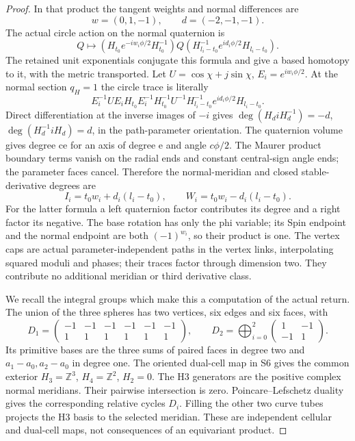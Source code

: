 \begin{proof}
In that product the tangent weights and normal differences are
\[
                    w=(0,1,-1),\qquad d=(-2,-1,-1).
\]
The actual circle action on the normal quaternion is
\[
 Q\mapsto(H_{t_0}e^{-iw_i\phi/2}H_{t_0}^{-1})Q
       (H_{l_i-t_0}^{-1}e^{id_i\phi/2}H_{l_i-t_0}).
                                                               \tag{P3K.65.OR.14}
\]
The retained unit exponentials conjugate this formula and give a
based homotopy to it, with the metric transported. Let
\(U=\cos\chi+j\sin\chi\), \(E_i=e^{iw_i\phi/2}\). At the
normal section \(q_H=1\) the circle trace is literally
\[
 E_i^{-1}UE_i H_{t_0}E_i^{-1}H_{t_0}^{-1}U^{-1}
              H_{l_i-t_0}^{-1}e^{id_i\phi/2}H_{l_i-t_0}.
                                                               \tag{P3K.65.OR.15}
\]
Direct differentiation at the inverse images of \(-i\) gives
\(\deg(H_diH_d^{-1})=-d\),
\(\deg(H_d^{-1}iH_d)=d\), in the path-parameter orientation.
The quaternion volume gives degree ce for an axis of degree e
and angle \(c\phi/2\). The Maurer product boundary terms vanish
on the radial ends and constant central-sign angle ends; the
parameter faces cancel. Therefore the normal-meridian and closed
stable-derivative degrees are
\[
 I_i=t_0w_i+d_i(l_i-t_0),\qquad
 W_i=t_0w_i-d_i(l_i-t_0).                              \tag{P3K.65.OR.16}
\]
For the latter formula a left quaternion factor contributes its
degree and a right factor its negative. The base rotation has
only the phi variable; its Spin endpoint and the normal endpoint
are both \((-1)^{w_i}\), so their product is one. The vertex
caps are actual parameter-independent paths in the vertex links,
interpolating squared moduli and phases; their traces factor
through dimension two. They contribute no additional meridian
or third derivative class.

We recall the integral groups which make this a computation of
the actual return. The union of the three spheres has two vertices,
six edges and six faces, with
\[
 D_1=\begin{pmatrix}-1&-1&-1&-1&-1&-1\\1&1&1&1&1&1\end{pmatrix},
 \qquad D_2=\bigoplus_{i=0}^2
             \begin{pmatrix}1&-1\\-1&1\end{pmatrix}.
\]
Its primitive bases are the three sums of paired faces in degree
two and \(a_1-a_0,a_2-a_0\) in degree one. The oriented dual-cell
map in S6 gives the common exterior \(H_3=\mathbb Z^3\),
\(H_4=\mathbb Z^2\), \(H_2=0\). The H3 generators are the
positive complex normal meridians. Their pairwise intersection is
zero. Poincare--Lefschetz duality gives the corresponding relative
cycles \(D_i\). Filling the other two curve tubes projects the H3
basis to the selected meridian. These are independent cellular
and dual-cell maps, not consequences of an equivariant product.


\end{proof}
